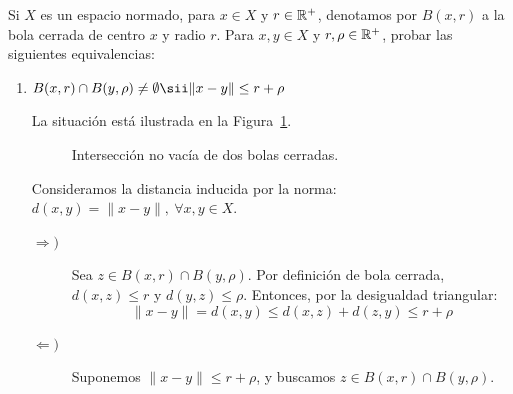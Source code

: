 \begin{ejercicio}
Si $X$ es un espacio normado, para $x \in X$ y $r \in \mathbb{R}^+$, denotamos por $B(x, r)$ a la bola cerrada de centro $x$ y radio $r$. Para $x, y \in X$ y $r, \rho \in \mathbb{R}^+$, probar las siguientes equivalencias:
\begin{enumerate}[label={\alph*)}]
    \item $B(x, r) \cap B(y, \rho) \neq \emptyset \sii \|x - y\| \leq r + \rho$
    
    La situación está ilustrada en la Figura~\ref{fig:interseccion_bolas}.
    \begin{figure}[htbp]
        \centering
        \caption{Intersección no vacía de dos bolas cerradas.}
        \label{fig:interseccion_bolas}
    \end{figure}

    Consideramos la distancia inducida por la norma: $d(x,y)=\|x-y\|,~\forall x,y\in X$.
    \begin{description}
        \item[$\Longrightarrow)$]
        Sea $z \in B(x, r) \cap B(y, \rho)$. Por definición de bola cerrada, $d(x, z) \leq r$ y $d(y, z) \leq \rho$. Entonces, por la desigualdad triangular:
        \begin{equation*}
            \|x - y\| = d(x, y) \leq d(x, z) + d(z, y) \leq r + \rho
        \end{equation*}

        \item[$\Longleftarrow)$]
        Suponemos $\|x - y\| \leq r + \rho$, y buscamos $z \in B(x, r) \cap B(y, \rho)$.
        

\end{description}
\end{enumerate}
\end{ejercicio}
